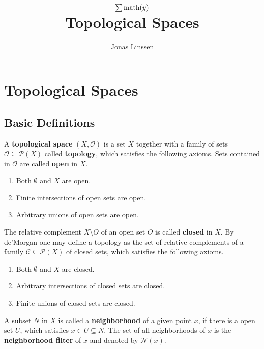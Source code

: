 

\title{$\sum \text{math}(y)$\\Topological Spaces}
\author{Jonas Linssen}



\maketitle
\tableofcontents

\newpage
\section{Topological Spaces}
\subsection{Basic Definitions}

\begin{definition}
	A \textbf{topological space} $(X,\mathcal{O})$ is a set $X$ together with a family of sets $\mathcal{O} \subseteq \mathcal{P}(X)$ called \textbf{topology}, which satisfies the following axioms. Sets contained in $\mathcal{O}$ are called \textbf{open} in $X$.
	\begin{enumerate}[$\bullet$]
		\item{
			Both $\emptyset$ and $X$ are open.
		}
		\item{
			Finite intersections of open sets are open.
		}
		\item{
			Arbitrary unions of open sets are open.
		}
	\end{enumerate}
	The relative complement $X \setminus O$ of an open set $O$ is called \textbf{closed} in $X$. By de'Morgan one may define a topology as the set of relative complements of a family $\mathcal{C} \subseteq \mathcal{P}(X)$ of closed sets, which satisfies the following axioms.
	\begin{enumerate}[$\bullet$]
		\item{
			Both $\emptyset$ and $X$ are closed.
		}
		\item{
			Arbitrary intersections of closed sets are closed.
		}
		\item{
			Finite unions of closed sets are closed.
		}
	\end{enumerate}

	A subset $N$ in $X$ is called a \textbf{neighborhood} of a given point $x$, if there is a open set $U$, which satisfies $x \in U \subseteq N$. The set of all neighborhoods of $x$ is the \textbf{neighborhood filter} of $x$ and denoted by $\mathcal{N}(x)$.
\end{definition}

